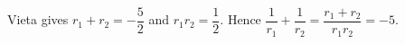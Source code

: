 Vieta gives $r_1+r_2=-\dfrac{5}{2}$ and $r_1r_2=\dfrac{1}{2}$. Hence $\dfrac{1}{r_1}+\dfrac{1}{r_2}=\dfrac{r_1+r_2}{r_1r_2}=\boxed{-5}$.
